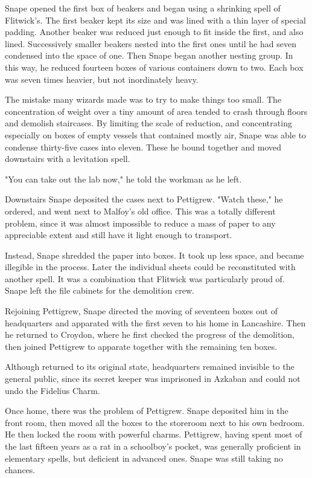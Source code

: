 \documentclass[a4paper,11pt]{article}
\begin{document}
Snape opened the first box of beakers and began using a shrinking spell of Flitwick's. The first beaker kept its size and was lined with a thin layer of special padding. Another beaker was reduced just enough to fit inside the first, and also lined. Successively smaller beakers nested into the first ones until he had seven condensed into the space of one. Then Snape began another nesting group. In this way, he reduced fourteen boxes of various containers down to two. Each box was seven times heavier, but not inordinately heavy.

The mistake many wizards made was to try to make things too small. The concentration of weight over a tiny amount of area tended to crash through floors and demolish staircases. By limiting the scale of reduction, and concentrating especially on boxes of empty vessels that contained mostly air, Snape was able to condense thirty-five cases into eleven. These he bound together and moved downstairs with a levitation spell.

"You can take out the lab now," he told the workman as he left.

Downstairs Snape deposited the cases next to Pettigrew. "Watch these," he ordered, and went next to Malfoy's old office. This was a totally different problem, since it was almost impossible to reduce a mass of paper to any appreciable extent and still have it light enough to transport.

Instead, Snape shredded the paper into boxes. It took up less space, and became illegible in the process. Later the individual sheets could be reconstituted with another spell. It was a combination that Flitwick was particularly proud of. Snape left the file cabinets for the demolition crew.

Rejoining Pettigrew, Snape directed the moving of seventeen boxes out of headquarters and apparated with the first seven to his home in Lancashire. Then he returned to Croydon, where he first checked the progress of the demolition, then joined Pettigrew to apparate together with the remaining ten boxes.

Although returned to its original state, headquarters remained invisible to the general public, since its secret keeper was imprisoned in Azkaban and could not undo the Fidelius Charm.

Once home, there was the problem of Pettigrew. Snape deposited him in the front room, then moved all the boxes to the storeroom next to his own bedroom. He then locked the room with powerful charms. Pettigrew, having spent most of the last fifteen years as a rat in a schoolboy's pocket, was generally proficient in elementary spells, but deficient in advanced ones. Snape was still taking no chances.
\end{document}
